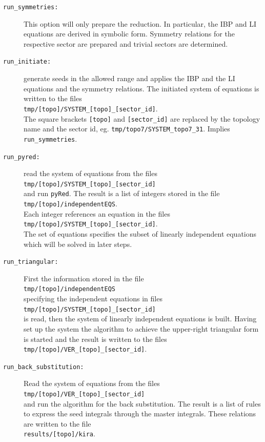 \documentclass[a4paper,12pt]{scrartcl}
\newcommand*{\pyred}{\texttt{pyRed}}
\begin{document}
\begin{description}
\item[\texttt{run\_symmetries:}]
  This option will only prepare the reduction. In particular, the IBP and LI
  equations are derived in symbolic form. Symmetry relations for the respective
  sector are prepared and trivial sectors are determined.
\item[\texttt{run\_initiate:}] generate seeds in the allowed
  range and applies the IBP and the LI equations and the symmetry
  relations. The initiated system of equations is written to the files\\
  \texttt{tmp/[topo]/SYSTEM\_[topo]\_[sector\_id]}.\\
  The square brackets
  \texttt{[topo]} and \texttt{[sector\_id]} are replaced by the
  topology name and the sector id, eg.
  \texttt{tmp/topo7/SYSTEM\_topo7\_31}.
  Implies \texttt{run\_symmetries}.
\item[\texttt{run\_pyred:}]
  read the system of equations from the files\\
  \texttt{tmp/[topo]/SYSTEM\_[topo]\_[sector\_id]}\\
  and run \pyred{}.
  The result is a list of integers stored in the file\\
  \texttt{tmp/[topo]/independentEQS}.\\
  Each integer references an equation in the files\\
  \texttt{tmp/[topo]/SYSTEM\_[topo]\_[sector\_id]}.\\ The set of
  equations specifies the subset of linearly independent equations
  which will be solved in later steps.
\item[\texttt{run\_triangular:}]
  First the information stored in the file\\
  \texttt{tmp/[topo]/independentEQS}\\
  specifying the independent
  equations in files\\
  \texttt{tmp/[topo]/SYSTEM\_[topo]\_[sector\_id]}\\
  is read, then
  the system of linearly independent equations
  is built. Having set up the system the algorithm to achieve the upper-right
  triangular form is started and the result is written to the files\\
  \texttt{tmp/[topo]/VER\_[topo]\_[sector\_id]}.
\item[\texttt{run\_back\_substitution:}]
  Read the system of equations from the files\\
  \texttt{tmp/[topo]/VER\_[topo]\_[sector\_id]}\\
  and run the algorithm
  for the back substitution. The result is a list of rules to express the
  seed integrals through the master integrals. These relations are
  written to the file\\
  \texttt{results/[topo]/kira}.
\end{description}
\end{document}
